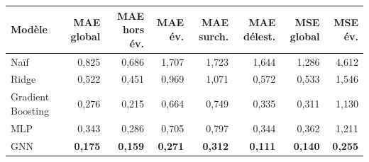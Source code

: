\begin{tabular}{lrrrrrrr}
\toprule
Modèle & MAE global & MAE hors év. & MAE év. & MAE surch. & MAE délest. & MSE global & MSE év. \\
\midrule
Naïf & 0{,}825 & 0{,}686 & 1{,}707 & 1{,}723 & 1{,}644 & 1{,}286 & 4{,}612 \\
Ridge & 0{,}522 & 0{,}451 & 0{,}969 & 1{,}071 & 0{,}572 & 0{,}533 & 1{,}546 \\
Gradient Boosting & 0{,}276 & 0{,}215 & 0{,}664 & 0{,}749 & 0{,}335 & 0{,}311 & 1{,}130 \\
MLP & 0{,}343 & 0{,}286 & 0{,}705 & 0{,}797 & 0{,}344 & 0{,}362 & 1{,}211 \\
GNN & \textbf{0{,}175} & \textbf{0{,}159} & \textbf{0{,}271} & \textbf{0{,}312} & \textbf{0{,}111} & \textbf{0{,}140} & \textbf{0{,}255} \\
\bottomrule
\end{tabular}